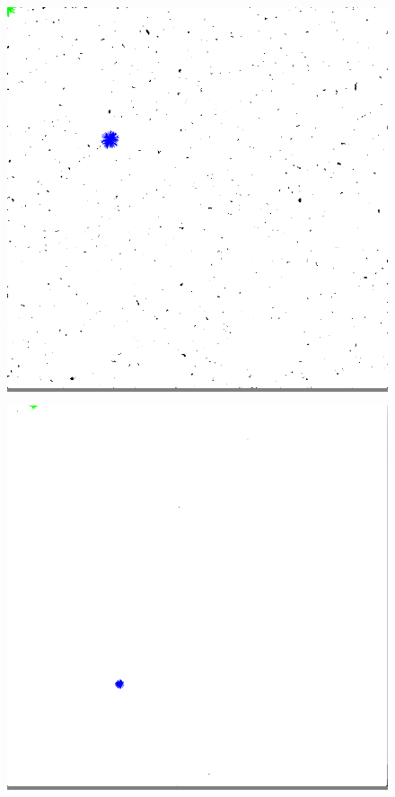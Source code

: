 \documentclass{article}
\begin{document}
\begin{figure}
\begin{minipage}{0.3\textwidth}
    \end{minipage}
    \hspace{\fill}
    \begin{minipage}{0.3\textwidth}
    \colorbox{gray}{\includegraphics[width=\linewidth]{./images/square_4.png}}
    \end{minipage}
    \hspace{\fill}
    \begin{minipage}{0.3\textwidth}
    \colorbox{gray}{\includegraphics[width=\linewidth]{./images/square_5.png}}

\end{minipage}
\end{figure}
\end{document}
